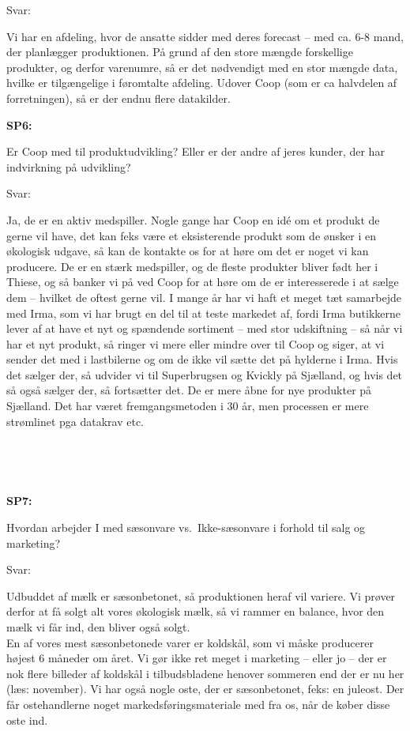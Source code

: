 \documentclass[
  12pt,
  a4paper,
  DIV=11,
  numbers=noendperiod]{scrartcl}
\begin{document}
\begin{itemize}
  Svar:~

  Vi har en afdeling, hvor de ansatte sidder med deres forecast -- med
  ca. 6-8 mand, der planlægger produktionen. På grund af den store
  mængde forskellige produkter, og derfor varenumre, så er det
  nødvendigt med en stor mængde data, hvilke er tilgængelige i
  føromtalte afdeling. Udover Coop (som er ca halvdelen af
  forretningen), så er der endnu flere datakilder.~

  \textbf{SP6:} ~

  Er Coop med til produktudvikling? Eller er der andre af jeres kunder,
  der har indvirkning på udvikling?~

  Svar:~

  Ja, de er en aktiv medspiller. Nogle gange har Coop en idé om et
  produkt de gerne vil have, det kan feks være et eksisterende produkt
  som de ønsker i en økologisk udgave, så kan de kontakte os for at høre
  om det er noget vi kan producere. De er en stærk medspiller, og de
  fleste produkter bliver født her i Thiese, og så banker vi på ved Coop
  for at høre om de er interesserede i at sælge dem -- hvilket de oftest
  gerne vil. I mange år har vi haft et meget tæt samarbejde med Irma,
  som vi har brugt en del til at teste markedet af, fordi Irma
  butikkerne lever af at have et nyt og spændende sortiment -- med stor
  udskiftning -- så når vi har et nyt produkt, så ringer vi mere eller
  mindre over til Coop og siger, at vi sender det med i lastbilerne og
  om de ikke vil sætte det på hylderne i Irma. Hvis det sælger der, så
  udvider vi til Superbrugsen og Kvickly på Sjælland, og hvis det så
  også sælger der, så fortsætter det. De er mere åbne for nye produkter
  på Sjælland. Det har været fremgangsmetoden i 30 år, men processen er
  mere strømlinet pga datakrav etc.~

  ~

  ~

  \textbf{SP7:}~

  Hvordan arbejder I med sæsonvare vs.~Ikke-sæsonvare i forhold til salg
  og marketing?~

  Svar:~

  Udbuddet af mælk er sæsonbetonet, så produktionen heraf vil variere.
  Vi prøver derfor at få solgt alt vores økologisk mælk, så vi rammer en
  balance, hvor den mælk vi får ind, den bliver også solgt.~\\
  En af vores mest sæsonbetonede varer er koldskål, som vi måske
  producerer højest 6 måneder om året. Vi gør ikke ret meget i marketing
  -- eller jo -- der er nok flere billeder af koldskål i tilbudsbladene
  henover sommeren end der er nu her (læs: november). Vi har også nogle
  oste, der er sæsonbetonet, feks: en juleost. Der får ostehandlerne
  noget markedsføringsmateriale med fra os, når de køber disse oste
  ind.~~


\end{itemize}
\end{document}
